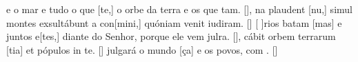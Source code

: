 {    {e o mar e tudo o que [te,] o orbe da terra e os que tam. [\LinkPT]},
  {na plaudent [nu,] simul montes exsultábunt a con[mini,] quóniam venit iudiram. [\LinkLA]}%
    {[ ]{ri}os batam [mas] e juntos e[tes,] diante do Senhor, porque ele vem julra. [\LinkPT]},
  {cábit orbem terrarum [tia] et pópulos in \-te. [\LinkLA]}%
    { julgará o mundo [ça] e os povos, com . [\LinkPT]}
}